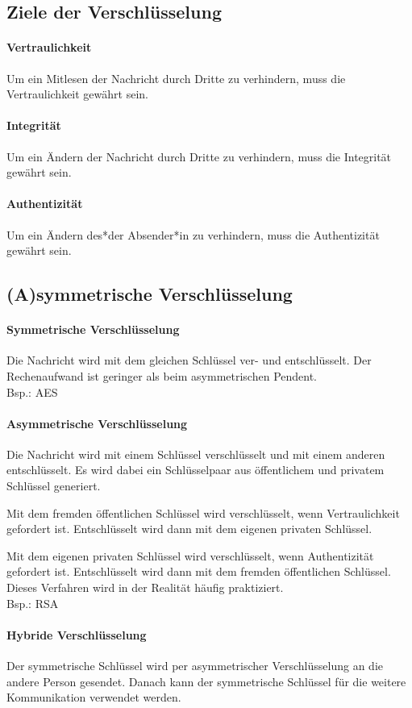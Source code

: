 \documentclass[10pt]{article}
\begin{document}
\subsection{Ziele der Verschlüsselung}
\paragraph{Vertraulichkeit}
Um ein Mitlesen der Nachricht durch Dritte zu verhindern, muss die Vertraulichkeit gewährt sein.
\paragraph{Integrität}
Um ein Ändern der Nachricht durch Dritte zu verhindern, muss die Integrität gewährt sein.
\paragraph{Authentizität}
Um ein Ändern des*der Absender*in zu verhindern, muss die Authentizität gewährt sein.
\subsection{(A)symmetrische Verschlüsselung}
\paragraph{Symmetrische Verschlüsselung} Die Nachricht wird mit dem gleichen Schlüssel ver- und entschlüsselt. Der Rechenaufwand ist geringer als beim asymmetrischen Pendent.\\
Bsp.: AES
\paragraph{Asymmetrische Verschlüsselung} Die Nachricht wird mit einem Schlüssel verschlüsselt und mit einem anderen entschlüsselt. Es wird dabei ein Schlüsselpaar aus öffentlichem und privatem Schlüssel generiert.

Mit dem fremden öffentlichen Schlüssel wird verschlüsselt, wenn Vertraulichkeit gefordert ist. Entschlüsselt wird dann mit dem eigenen privaten Schlüssel.

Mit dem eigenen privaten Schlüssel wird verschlüsselt, wenn Authentizität gefordert ist. Entschlüsselt wird dann mit dem fremden öffentlichen Schlüssel. Dieses Verfahren wird in der
Realität häufig praktiziert.
\\
Bsp.: RSA
\paragraph{Hybride Verschlüsselung} Der symmetrische Schlüssel wird per asymmetrischer Verschlüsselung an die andere Person gesendet. Danach kann der symmetrische Schlüssel für die weitere Kommunikation verwendet werden.
\end{document}
